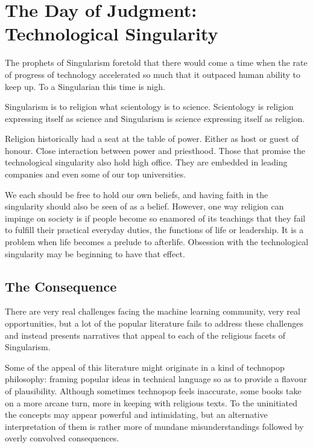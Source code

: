 \documentclass[a4paper]{caesar_book}
\begin{document}
\section{The Day of Judgment: Technological Singularity}

The prophets of Singularism foretold that there would come a time when the rate of progress of technology accelerated so much that it outpaced human ability to keep up. To a Singularian this time is nigh.

Singularism is to religion what scientology is to science. Scientology is religion expressing itself as science and Singularism is science expressing itself as religion.

Religion historically had a seat at the table of power. Either as host or guest of honour. Close interaction between power and priesthood. Those that promise the technological singularity also hold high office. They are embedded in leading companies and even some of our top universities.

We each should be free to hold our own beliefs, and having faith in the singularity should also be seen of as a belief. However, one way religion can impinge on society is if people become so enamored of its teachings that they fail to fulfill their practical everyday duties, the functions of life or leadership. It is a problem when life becomes a prelude to afterlife. Obsession with the technological singularity may be beginning to have that effect.

\subsection{The Consequence}

There are very real challenges facing the machine learning community, very real opportunities, but a lot of the popular literature fails to address these challenges and instead presents narratives that appeal to each of the religious facets of Singularism.

Some of the appeal of this literature might originate in a kind of technopop philosophy: framing popular ideas in technical language so as to provide a flavour of plausibility. Although sometimes technopop feels inaccurate, some books take on a more arcane turn, more in keeping with religious texts. To the uninitiated the concepts may appear powerful and intimidating, but an alternative interpretation of them is rather more of mundane misunderstandings followed by overly convolved consequences.
\end{document}
